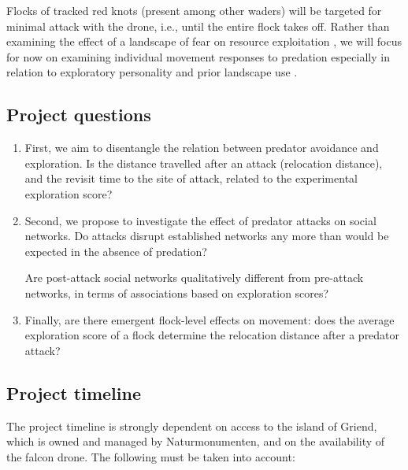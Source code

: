 \documentclass[10pt]{article}
\begin{document}
\begin{spacing}{1.15}
Flocks of tracked red knots (present among other waders) will be targeted for minimal attack with the drone, i.e., until the entire flock takes off. Rather than examining the effect of a landscape of fear on resource exploitation \autocite[as in][see esp. Fig. 2]{bijleveld2015c}, we will focus for now on examining individual movement responses to predation especially in relation to exploratory personality and prior landscape use \autocite[as in][]{bijleveld2016}. 

\subsection{Project questions}

\begin{enumerate}
	\item
	First, we aim to disentangle the relation between predator avoidance and exploration. Is the distance travelled after an attack (relocation distance), and the revisit time to the site of attack, related to the experimental exploration score?
	
	\item 
	Second, we propose to investigate the effect of predator attacks on social networks. Do attacks disrupt established networks any more than would be expected in the absence of predation?
	
	Are post-attack social networks qualitatively different from pre-attack networks, in terms of associations based on exploration scores?
	
	\item 
	Finally, are there emergent flock-level effects on movement: does the average exploration score of a flock determine the relocation distance after a predator attack?
	
\end{enumerate}
 
\subsection{Project timeline}

The project timeline is strongly dependent on access to the island of Griend, which is owned and managed by Naturmonumenten, and on the availability of the falcon drone.
The following must be taken into account:


\end{spacing}
\end{document}

